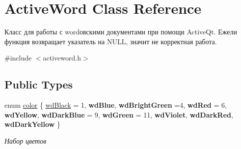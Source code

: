 \hypertarget{class_active_word}{}\section{Active\+Word Class Reference}
\label{class_active_word}


Класс для работы с word\textquotesingle{}овскими документами при помощи Active\+Qt. Ежели функция возвращает указатель на N\+U\+LL, значит не корректная работа.  




{\ttfamily \#include $<$activeword.\+h$>$}

\subsection*{Public Types}
\begin{DoxyCompactItemize}
\item 
enum \hyperlink{class_active_word_a8d6e8aa40990a0f496a31c419e0849f8}{color} \{ \newline
\hyperlink{class_active_word_a8d6e8aa40990a0f496a31c419e0849f8a39892314c5f58ec0115b8f87d5fff1d7}{wd\+Black} = 1, 
{\bfseries wd\+Blue}, 
{\bfseries wd\+Bright\+Green} =4, 
{\bfseries wd\+Red} = 6, 
\newline
{\bfseries wd\+Yellow}, 
{\bfseries wd\+Dark\+Blue} = 9, 
{\bfseries wd\+Green} = 11, 
{\bfseries wd\+Violet}, 
\newline
{\bfseries wd\+Dark\+Red}, 
{\bfseries wd\+Dark\+Yellow}
 \}\begin{DoxyCompactList}\small\item\em Набор цветов \end{DoxyCompactList}
\end{DoxyCompactItemize}
